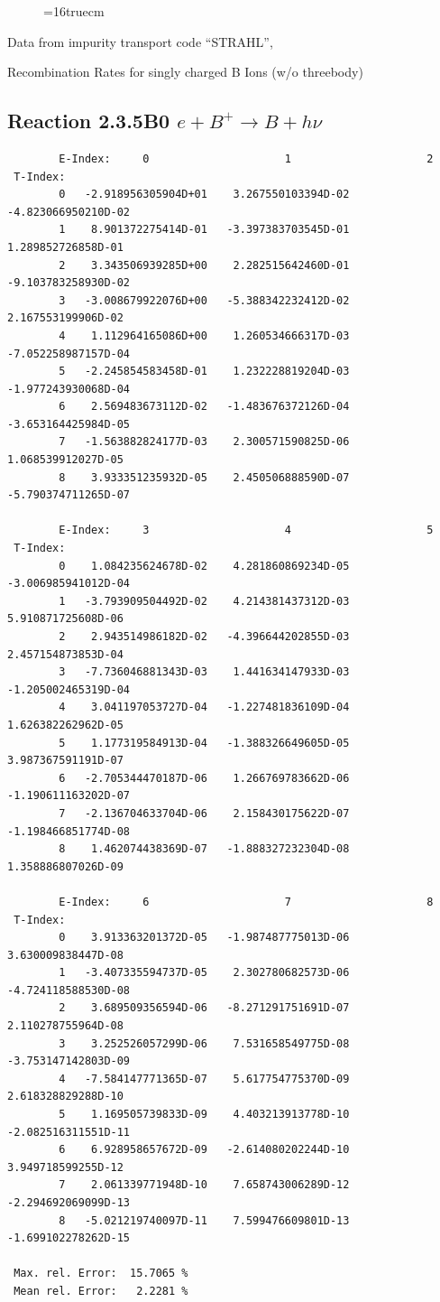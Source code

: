 \documentclass[12pt,dvips]{article}
\begin{document}
\begin{figure} \label{2.3.4B1}
\epsfxsize=16truecm
\end{figure}
\newpage
Data from impurity transport code ``STRAHL'', \cite{kn:Behringer}

  Recombination Rates for singly charged B Ions (w/o threebody)
\subsection{
Reaction 2.3.5B0 $ e + B^+ \rightarrow B + h\nu $
}


\begin{small}\begin{verbatim}
        E-Index:     0                     1                     2
 T-Index:
        0   -2.918956305904D+01    3.267550103394D-02   -4.823066950210D-02
        1    8.901372275414D-01   -3.397383703545D-01    1.289852726858D-01
        2    3.343506939285D+00    2.282515642460D-01   -9.103783258930D-02
        3   -3.008679922076D+00   -5.388342232412D-02    2.167553199906D-02
        4    1.112964165086D+00    1.260534666317D-03   -7.052258987157D-04
        5   -2.245854583458D-01    1.232228819204D-03   -1.977243930068D-04
        6    2.569483673112D-02   -1.483676372126D-04   -3.653164425984D-05
        7   -1.563882824177D-03    2.300571590825D-06    1.068539912027D-05
        8    3.933351235932D-05    2.450506888590D-07   -5.790374711265D-07

        E-Index:     3                     4                     5
 T-Index:
        0    1.084235624678D-02    4.281860869234D-05   -3.006985941012D-04
        1   -3.793909504492D-02    4.214381437312D-03    5.910871725608D-06
        2    2.943514986182D-02   -4.396644202855D-03    2.457154873853D-04
        3   -7.736046881343D-03    1.441634147933D-03   -1.205002465319D-04
        4    3.041197053727D-04   -1.227481836109D-04    1.626382262962D-05
        5    1.177319584913D-04   -1.388326649605D-05    3.987367591191D-07
        6   -2.705344470187D-06    1.266769783662D-06   -1.190611163202D-07
        7   -2.136704633704D-06    2.158430175622D-07   -1.198466851774D-08
        8    1.462074438369D-07   -1.888327232304D-08    1.358886807026D-09

        E-Index:     6                     7                     8
 T-Index:
        0    3.913363201372D-05   -1.987487775013D-06    3.630009838447D-08
        1   -3.407335594737D-05    2.302780682573D-06   -4.724118588530D-08
        2    3.689509356594D-06   -8.271291751691D-07    2.110278755964D-08
        3    3.252526057299D-06    7.531658549775D-08   -3.753147142803D-09
        4   -7.584147771365D-07    5.617754775370D-09    2.618328829288D-10
        5    1.169505739833D-09    4.403213913778D-10   -2.082516311551D-11
        6    6.928958657672D-09   -2.614080202244D-10    3.949718599255D-12
        7    2.061339771948D-10    7.658743006289D-12   -2.294692069099D-13
        8   -5.021219740097D-11    7.599476609801D-13   -1.699102278262D-15

 Max. rel. Error:  15.7065 %
 Mean rel. Error:   2.2281 %

\end{verbatim}\end{small}
\end{document}
